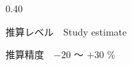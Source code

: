 \begin{frame}[t]
\begin{columns}[T,onlytextwidth]
\begin{column}{0.40\textwidth}
      \vspace{0.7em}
      {\scriptsize 推算レベル　Study estimate\par
       推算精度　$-20$ ～ $+30$ \%}\par
    \end{column}
  \end{columns}

\end{frame}
